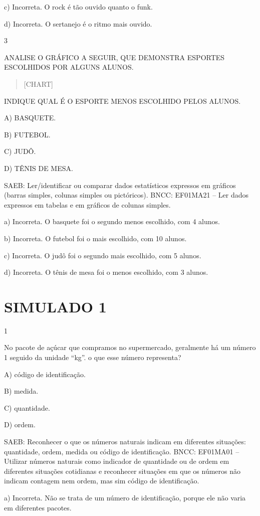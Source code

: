 c) Incorreta. O rock é tão ouvido quanto o funk.

d) Incorreta. O sertanejo é o ritmo mais ouvido.

\num{3}

ANALISE O GRÁFICO A SEGUIR, QUE DEMONSTRA ESPORTES ESCOLHIDOS POR ALGUNS ALUNOS.

\begin{quote}
{{[}CHART{]}}
\end{quote}

INDIQUE QUAL É O ESPORTE MENOS ESCOLHIDO PELOS ALUNOS.

A) BASQUETE.

B) FUTEBOL.

C) JUDÔ.

D) TÊNIS DE MESA.

SAEB:
Ler/identificar ou comparar dados estatísticos expressos em gráficos
(barras simples, colunas simples ou pictóricos).
BNCC: EF01MA21 -- Ler dados expressos em tabelas e em gráficos de colunas
simples.

a) Incorreta. O basquete foi o segundo menos escolhido, com 4 alunos.

b) Incorreta. O futebol foi o mais escolhido, com 10 alunos.

c) Incorreta. O judô foi o segundo mais escolhido, com 5 alunos.

d) Incorreta. O tênis de mesa foi o menos escolhido, com 3 alunos.

\chapter{SIMULADO 1}

\num{1}

No pacote de açúcar que compramos no supermercado, geralmente há um número
1 seguido da unidade ``kg''. o que esse número representa?

A) código de identificação.

B) medida.

C) quantidade.

D) ordem.

SAEB: Reconhecer o que os números naturais indicam em diferentes
situações: quantidade, ordem, medida ou código de identificação.
BNCC: EF01MA01 -- Utilizar números naturais como indicador de quantidade
ou de ordem em diferentes situações cotidianas e reconhecer situações em
que os números não indicam contagem nem ordem, mas sim código de
identificação.

a) Incorreta. Não se trata de um número de identificação, porque ele não varia em diferentes pacotes.

